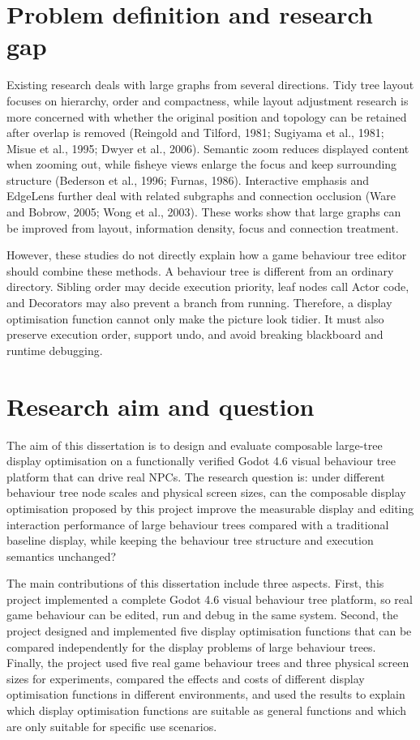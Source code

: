 \documentclass[11pt,a4paper,oneside,extrafontsizes]{memoir}
\begin{document}
\section{Problem definition and research gap}

Existing research deals with large graphs from several directions. Tidy tree layout focuses on hierarchy, order and compactness, while layout adjustment research is more concerned with whether the original position and topology can be retained after overlap is removed (Reingold and Tilford, 1981; Sugiyama et al., 1981; Misue et al., 1995; Dwyer et al., 2006). Semantic zoom reduces displayed content when zooming out, while fisheye views enlarge the focus and keep surrounding structure (Bederson et al., 1996; Furnas, 1986). Interactive emphasis and EdgeLens further deal with related subgraphs and connection occlusion (Ware and Bobrow, 2005; Wong et al., 2003). These works show that large graphs can be improved from layout, information density, focus and connection treatment.

However, these studies do not directly explain how a game behaviour tree editor should combine these methods. A behaviour tree is different from an ordinary directory. Sibling order may decide execution priority, leaf nodes call Actor code, and Decorators may also prevent a branch from running. Therefore, a display optimisation function cannot only make the picture look tidier. It must also preserve execution order, support undo, and avoid breaking blackboard and runtime debugging.

\section{Research aim and question}

The aim of this dissertation is to design and evaluate composable large-tree display optimisation on a functionally verified Godot 4.6 visual behaviour tree platform that can drive real NPCs. The research question is: under different behaviour tree node scales and physical screen sizes, can the composable display optimisation proposed by this project improve the measurable display and editing interaction performance of large behaviour trees compared with a traditional baseline display, while keeping the behaviour tree structure and execution semantics unchanged?

The main contributions of this dissertation include three aspects. First, this project implemented a complete Godot 4.6 visual behaviour tree platform, so real game behaviour can be edited, run and debug in the same system. Second, the project designed and implemented five display optimisation functions that can be compared independently for the display problems of large behaviour trees. Finally, the project used five real game behaviour trees and three physical screen sizes for experiments, compared the effects and costs of different display optimisation functions in different environments, and used the results to explain which display optimisation functions are suitable as general functions and which are only suitable for specific use scenarios.
\end{document}
